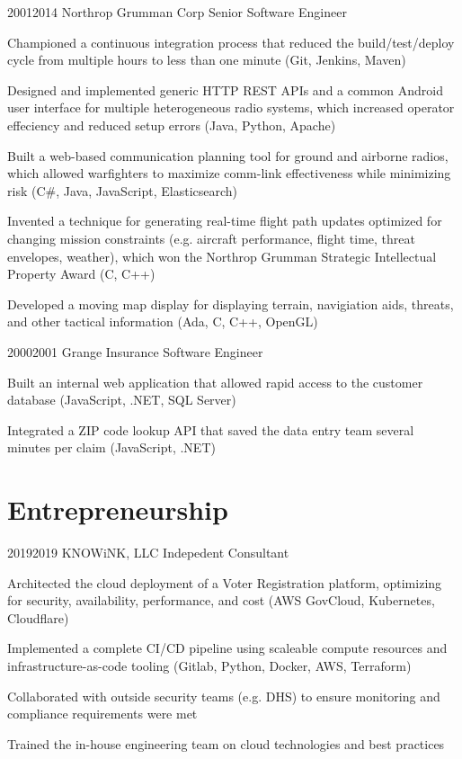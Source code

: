 \documentclass{article}
\begin{document}
\job
  {2001}{2014}
  {Northrop Grumman Corp}
  {Senior Software Engineer}
  {\begin{achievements}
    \item Championed a continuous integration process that reduced the build/test/deploy cycle from multiple hours to less than one minute (Git, Jenkins, Maven)
    \item Designed and implemented generic HTTP REST APIs and a common Android user interface for multiple heterogeneous radio systems, which increased operator effeciency and reduced setup errors (Java, Python, Apache)
    \item Built a web-based communication planning tool for ground and airborne radios, which allowed warfighters to maximize comm-link effectiveness while minimizing risk (C\#, Java, JavaScript, Elasticsearch)
    \item Invented a technique for generating real-time flight path updates optimized for changing mission constraints (e.g. aircraft performance, flight time, threat envelopes, weather), which won the Northrop Grumman Strategic Intellectual Property Award (C, C++)
    \item Developed a moving map display for displaying terrain, navigiation aids, threats, and other tactical information (Ada, C, C++, OpenGL)
  \end{achievements}}

\job
  {2000}{2001}
  {Grange Insurance}
  {Software Engineer}
  {\begin{achievements}
    \item Built an internal web application that allowed rapid access to the customer database (JavaScript, .NET, SQL Server)
    \item Integrated a ZIP code lookup API that saved the data entry team several minutes per claim (JavaScript, .NET)
  \end{achievements}}


\pagebreak


\section{Entrepreneurship}

\job
  {2019}{2019}
  {KNOWiNK, LLC}
  {Indepedent Consultant}
  {\begin{achievements}
    \item Architected the cloud deployment of a Voter Registration platform, optimizing for security, availability, performance, and cost (AWS GovCloud, Kubernetes, Cloudflare)
    \item Implemented a complete CI/CD pipeline using scaleable compute resources and infrastructure-as-code tooling (Gitlab, Python, Docker, AWS, Terraform)
    \item Collaborated with outside security teams (e.g. DHS) to ensure monitoring and compliance requirements were met
    \item Trained the in-house engineering team on cloud technologies and best practices
  \end{achievements}}
\end{document}
